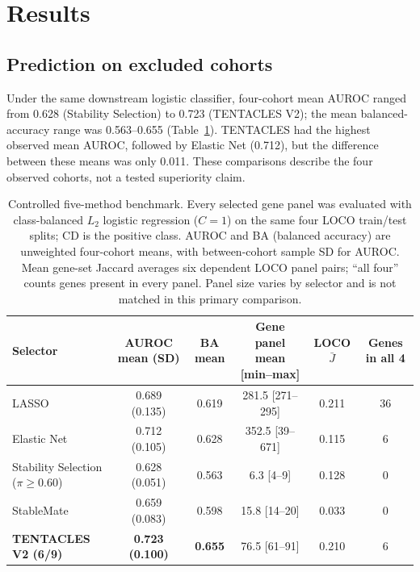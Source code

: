 \section{Results}
\label{sec:results}
\subsection{Prediction on excluded cohorts}
\label{sec:results_prediction}
Under the same downstream logistic classifier, four-cohort mean AUROC ranged from 0.628 (Stability Selection) to 0.723 (TENTACLES V2); the mean balanced-accuracy range was 0.563--0.655 (Table~\ref{tab:results_main}). TENTACLES had the highest observed mean AUROC, followed by Elastic Net (0.712), but the difference between these means was only 0.011. These comparisons describe the four observed cohorts, not a tested superiority claim.

\begin{table}[!t]
\caption{Controlled five-method benchmark. Every selected gene panel was evaluated with class-balanced $L_2$ logistic regression ($C=1$) on the same four LOCO train/test splits; CD is the positive class. AUROC and BA (balanced accuracy) are unweighted four-cohort means, with between-cohort sample SD for AUROC. Mean gene-set Jaccard averages six dependent LOCO panel pairs; ``all four'' counts genes present in every panel. Panel size varies by selector and is not matched in this primary comparison.}
\label{tab:results_main}
\centering\footnotesize
\setlength{\tabcolsep}{5.4pt}
\renewcommand{\arraystretch}{1.18}
\begin{tabular}{@{}lccccc@{}}
\toprule
Selector & AUROC mean (SD) & BA mean & Gene panel mean [min--max] & LOCO $\bar J$ & Genes in all 4\\
\midrule
LASSO & 0.689 (0.135) & 0.619 & 281.5 [271--295] & 0.211 & 36\\
Elastic Net & 0.712 (0.105) & 0.628 & 352.5 [39--671] & 0.115 & 6\\
Stability Selection ($\pi\geq0.60$) & 0.628 (0.051) & 0.563 & 6.3 [4--9] & 0.128 & 0\\
StableMate & 0.659 (0.083) & 0.598 & 15.8 [14--20] & 0.033 & 0\\
\textbf{TENTACLES V2 (6/9)} & \textbf{0.723 (0.100)} & \textbf{0.655} & 76.5 [61--91] & 0.210 & 6\\
\bottomrule
\end{tabular}
\end{table}

